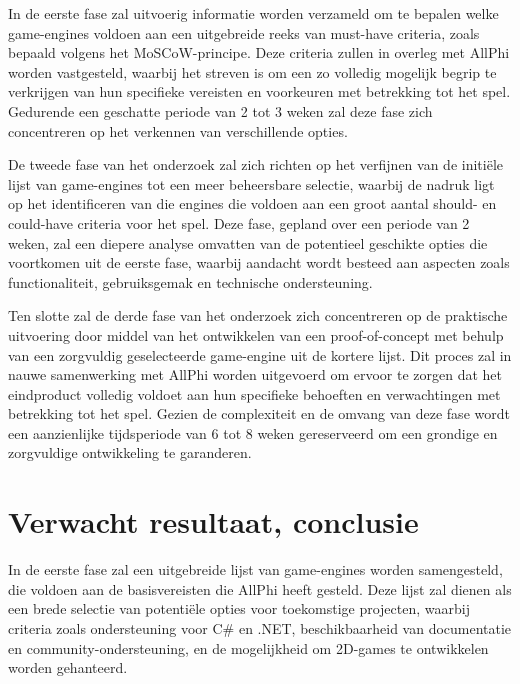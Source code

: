 In de eerste fase zal uitvoerig informatie worden verzameld om te bepalen welke game-engines voldoen aan een uitgebreide reeks van must-have criteria, zoals bepaald volgens het MoSCoW-principe. Deze criteria zullen in overleg met AllPhi worden vastgesteld, waarbij het streven is om een zo volledig mogelijk begrip te verkrijgen van hun specifieke vereisten en voorkeuren met betrekking tot het spel. Gedurende een geschatte periode van 2 tot 3 weken zal deze fase zich concentreren op het verkennen van verschillende opties.

De tweede fase van het onderzoek zal zich richten op het verfijnen van de initiële lijst van game-engines tot een meer beheersbare selectie, waarbij de nadruk ligt op het identificeren van die engines die voldoen aan een groot aantal should- en could-have criteria voor het spel. Deze fase, gepland over een periode van 2 weken, zal een diepere analyse omvatten van de potentieel geschikte opties die voortkomen uit de eerste fase, waarbij aandacht wordt besteed aan aspecten zoals functionaliteit, gebruiksgemak en technische ondersteuning.

Ten slotte zal de derde fase van het onderzoek zich concentreren op de praktische uitvoering door middel van het ontwikkelen van een proof-of-concept met behulp van een zorgvuldig geselecteerde game-engine uit de kortere lijst. Dit proces zal in nauwe samenwerking met AllPhi worden uitgevoerd om ervoor te zorgen dat het eindproduct volledig voldoet aan hun specifieke behoeften en verwachtingen met betrekking tot het spel. Gezien de complexiteit en de omvang van deze fase wordt een aanzienlijke tijdsperiode van 6 tot 8 weken gereserveerd om een grondige en zorgvuldige ontwikkeling te garanderen.


\section{Verwacht resultaat, conclusie}%
\label{sec:verwachte_resultaten}

In de eerste fase zal een uitgebreide lijst van game-engines worden samengesteld, die voldoen aan de basisvereisten die AllPhi heeft gesteld. Deze lijst zal dienen als een brede selectie van potentiële opties voor toekomstige projecten, waarbij criteria zoals ondersteuning voor C\# en .NET, beschikbaarheid van documentatie en community-ondersteuning, en de mogelijkheid om 2D-games te ontwikkelen worden gehanteerd.

